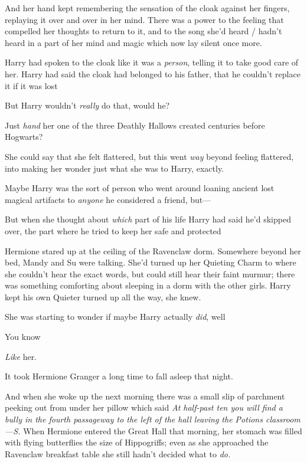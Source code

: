 And her hand kept remembering the sensation of the cloak against her fingers,
replaying it over and over in her mind. There was a power to the feeling that
compelled her thoughts to return to it, and to the song she'd heard / hadn't
heard in a part of her mind and magic which now lay silent once more.

Harry had spoken to the cloak like it was a \emph{person}, telling it to take
good care of her. Harry had said the cloak had belonged to his father, that he
couldn't replace it if it was lost{\el}

But{\el} Harry wouldn't \emph{really} do that, would he?

Just \emph{hand} her one of the three Deathly Hallows created centuries before
Hogwarts?

She could say that she felt flattered, but this went \emph{way} beyond feeling
flattered, into making her wonder just what she was to Harry, exactly.

Maybe Harry was the sort of person who went around loaning ancient lost magical
artifacts to \emph{anyone} he considered a friend, but—

But when she thought about \emph{which} part of his life Harry had said he'd
skipped over, the part where he tried to keep her safe and protected{\el}

Hermione stared up at the ceiling of the Ravenclaw dorm. Somewhere beyond her
bed, Mandy and Su were talking. She'd turned up her Quieting Charm to where she
couldn't hear the exact words, but could still hear their faint murmur; there
was something comforting about sleeping in a dorm with the other girls. Harry
kept his own Quieter turned up all the way, she knew.

She was starting to wonder if maybe Harry actually \emph{did}, well{\el}

You know{\el}

\emph{Like} her.

It took Hermione Granger a long time to fall asleep that night.

And when she woke up the next morning there was a small slip of parchment
peeking out from under her pillow which said \emph{At half-past ten you will
find a bully in the fourth passageway to the left of the hall leaving the
Potions classroom—S.}
\sbreak
When Hermione entered the Great Hall that morning, her stomach was filled with
flying butterflies the size of Hippogriffs; even as she approached the
Ravenclaw breakfast table she still hadn't decided what to \emph{do.}

